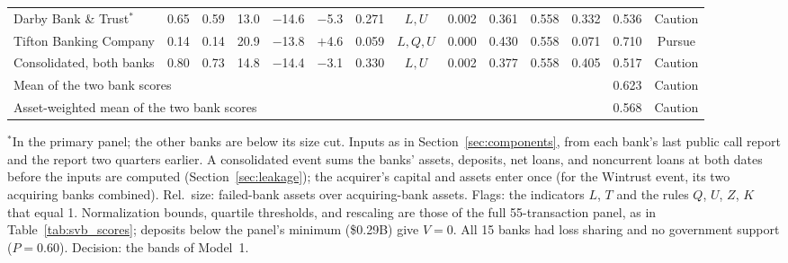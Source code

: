 \begin{table}[!t]
\begin{tabular*}{\textwidth}{@{\extracolsep{\fill}}lccccccccccccc}
Darby Bank \& Trust$^{*}$ & 0.65 & 0.59 & 13.0 & $-$14.6 & $-$5.3 & 0.271 & $L,U$ & 0.002 & 0.361 & 0.558 & 0.332 & 0.536 & Caution \\
Tifton Banking Company & 0.14 & 0.14 & 20.9 & $-$13.8 & $+$4.6 & 0.059 & $L,Q,U$ & 0.000 & 0.430 & 0.558 & 0.071 & 0.710 & Pursue \\
Consolidated, both banks & 0.80 & 0.73 & 14.8 & $-$14.4 & $-$3.1 & 0.330 & $L,U$ & 0.002 & 0.377 & 0.558 & 0.405 & 0.517 & Caution \\
\multicolumn{12}{l}{Mean of the two bank scores} & 0.623 & Caution \\
\multicolumn{12}{l}{Asset-weighted mean of the two bank scores} & 0.568 & Caution \\
\bottomrule
\end{tabular*}
\par\vspace{2pt}\parbox{0.96\textwidth}{\scriptsize $^{*}$In the primary panel; the other banks are below its size cut. Inputs as in
Section~\ref{sec:components}, from each bank's last public call report and the report two quarters earlier. A consolidated event sums
the banks' assets, deposits, net loans, and noncurrent loans at both dates before the inputs are computed
(Section~\ref{sec:leakage}); the acquirer's capital and assets enter once (for the Wintrust event, its two acquiring banks combined).
Rel.\ size: failed-bank assets over acquiring-bank assets. Flags: the indicators $L$, $T$ and the rules $Q$, $U$, $Z$, $K$ that equal 1.
Normalization bounds, quartile thresholds, and rescaling are those of the full 55-transaction panel, as in
Table~\ref{tab:svb_scores}; deposits below the panel's minimum (\$0.29B) give $V = 0$. All 15 banks had loss sharing and no
government support ($P = 0.60$). Decision: the bands of Model~1.}
\end{table}
